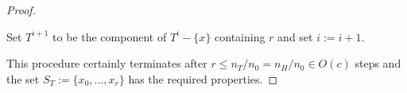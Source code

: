 \documentclass[kpfonts]{patmorin}
\DeclareMathOperator{\pw}{pw}
\theoremstyle{named}
\begin{document}
\begin{proof}
\begin{compactenum}
        \item Set $T^{i+1}$ to be the component of $T^i-\{x\}$ containing $r$ and set $i:=i+1$.
    \end{compactenum}
    This procedure certainly terminates after $r\le n_T/n_0 = n_H/n_0 \in O(c)$ steps and the set $S_T:=\{x_0,\ldots,x_r\}$ has the required properties.

\end{proof}
\end{document}
